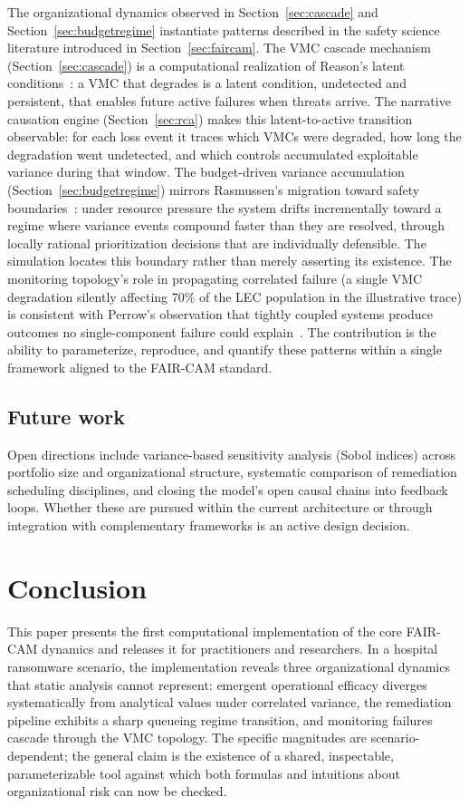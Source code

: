 \documentclass[11pt,a4paper]{article}
\begin{document}
The organizational dynamics observed in Section~\ref{sec:cascade} and Section~\ref{sec:budgetregime} instantiate patterns described in the safety science literature introduced in Section~\ref{sec:faircam}. The VMC cascade mechanism (Section~\ref{sec:cascade}) is a computational realization of Reason's latent conditions~\citep{Reason1990}: a VMC that degrades is a latent condition, undetected and persistent, that enables future active failures when threats arrive. The narrative causation engine (Section~\ref{sec:rca}) makes this latent-to-active transition observable: for each loss event it traces which VMCs were degraded, how long the degradation went undetected, and which controls accumulated exploitable variance during that window. The budget-driven variance accumulation (Section~\ref{sec:budgetregime}) mirrors Rasmussen's migration toward safety boundaries~\citep{Rasmussen1997}: under resource pressure the system drifts incrementally toward a regime where variance events compound faster than they are resolved, through locally rational prioritization decisions that are individually defensible. The simulation locates this boundary rather than merely asserting its existence. The monitoring topology's role in propagating correlated failure (a single VMC degradation silently affecting 70\% of the LEC population in the illustrative trace) is consistent with Perrow's observation that tightly coupled systems produce outcomes no single-component failure could explain~\citep{Perrow1984}. The contribution is the ability to parameterize, reproduce, and quantify these patterns within a single framework aligned to the FAIR-CAM standard.

\subsection{Future work}

Open directions include variance-based sensitivity analysis (Sobol indices) across portfolio size and organizational structure, systematic comparison of remediation scheduling disciplines, and closing the model's open causal chains into feedback loops. Whether these are pursued within the current architecture or through integration with complementary frameworks is an active design decision.


\section{Conclusion}

This paper presents the first computational implementation of the core FAIR-CAM dynamics and releases it for practitioners and researchers. In a hospital ransomware scenario, the implementation reveals three organizational dynamics that static analysis cannot represent: emergent operational efficacy diverges systematically from analytical values under correlated variance, the remediation pipeline exhibits a sharp queueing regime transition, and monitoring failures cascade through the VMC topology. The specific magnitudes are scenario-dependent; the general claim is the existence of a shared, inspectable, parameterizable tool against which both formulas and intuitions about organizational risk can now be checked.
\end{document}
